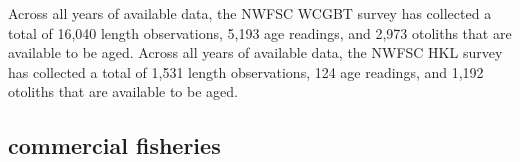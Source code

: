 \documentclass[11pt,
  english,
  letterpaper,
]{article}
\begin{document}
\leavevmode\tagmcend\tagstructend\par


Across all years of available data, the NWFSC WCGBT survey has collected a total of 16,040 length observations, 5,193 age readings, and 2,973 otoliths that are available to be aged. Across all years of available data, the NWFSC HKL survey has collected a total of 1,531 length observations, 124 age readings, and 1,192 otoliths that are available to be aged.

\leavevmode\tagmcend\tagstructend\par


\hypertarget{commercial-fisheries-60}{%
\subsection{commercial fisheries}\label{commercial-fisheries-60}}

\leavevmode\tagmcend\tagstructend


\begingroup\fontsize{10}{12}\selectfont \begingroup\fontsize{10}{12}\selectfont

\leavevmode\tagmcend\tagstructend\par
\end{document}
